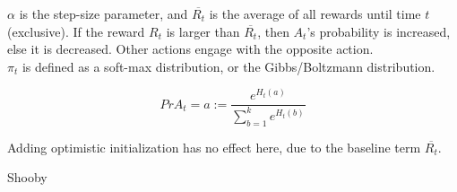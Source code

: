 \documentclass[a4paper]{article}
\begin{document}
$\alpha$ is the step-size parameter, and $\overline{R_t}$ is the average of all rewards until time $t$ (exclusive). If the reward $R_t$ is larger than $\overline{R_t}$, then $A_t$'s probability is increased, else it is decreased. Other actions engage with the opposite action.\\

$\pi_t$ is defined as a soft-max distribution, or the Gibbs/Boltzmann distribution.

$$Pr{A_t = a} := \frac{e^{H_t(a)}}{\sum_{b=1}^ke^{H_t(b)}}$$

Adding optimistic initialization has no effect here, due to the baseline term $\overline{R_t}$.

Shooby
\end{document}
